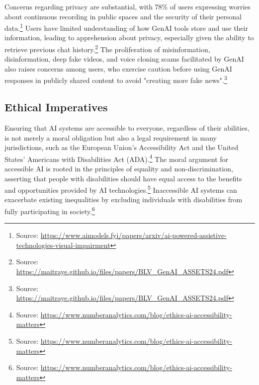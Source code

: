 Concerns regarding privacy are substantial, with 78\% of users expressing worries about continuous recording in public spaces and the security of their personal data.\footnote{Source: \url{https://www.aimodels.fyi/papers/arxiv/ai-powered-assistive-technologies-visual-impairment}} Users have limited understanding of how GenAI tools store and use their information, leading to apprehension about privacy, especially given the ability to retrieve previous chat history.\footnote{Source: \url{https://maitraye.github.io/files/papers/BLV_GenAI_ASSETS24.pdf}} The proliferation of misinformation, disinformation, deep fake videos, and voice cloning scams facilitated by GenAI also raises concerns among users, who exercise caution before using GenAI responses in publicly shared content to avoid "creating more fake news".\footnote{Source: \url{https://maitraye.github.io/files/papers/BLV_GenAI_ASSETS24.pdf}}


\subsection{Ethical Imperatives}

Ensuring that AI systems are accessible to everyone, regardless of their abilities, is not merely a moral obligation but also a legal requirement in many jurisdictions, such as the European Union's Accessibility Act and the United States' Americans with Disabilities Act (ADA).\footnote{Source: \url{https://www.numberanalytics.com/blog/ethics-ai-accessibility-matters}} The moral argument for accessible AI is rooted in the principles of equality and non-discrimination, asserting that people with disabilities should have equal access to the benefits and opportunities provided by AI technologies.\footnote{Source: \url{https://www.numberanalytics.com/blog/ethics-ai-accessibility-matters}} Inaccessible AI systems can exacerbate existing inequalities by excluding individuals with disabilities from fully participating in society.\footnote{Source: \url{https://www.numberanalytics.com/blog/ethics-ai-accessibility-matters}}

